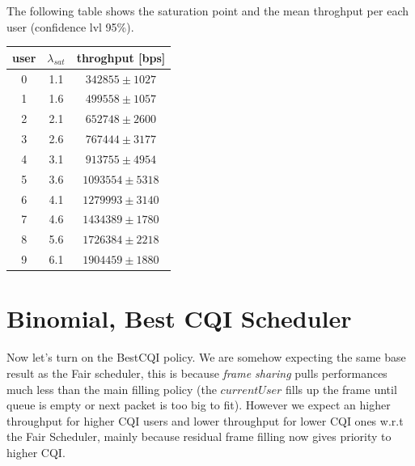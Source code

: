 The following table shows the saturation point and the mean throghput per each user (confidence lvl 95\%).
\begin{center}
	\begin{tabular}{|c | c | c|}
	\hline
	 \textbf{user}  & \textbf{\(\lambda_{sat}\)}  & \textbf{throghput [bps]} \\ \hline
	 0 & 1.1 & $342855 \pm 1027$ \\ \hline
	 1 & 1.6 & $499558 \pm 1057$\\ \hline
	 2 & 2.1 & $652748 \pm 2600$\\ \hline
	 3 & 2.6 & $767444 \pm 3177$\\ \hline
	 4 & 3.1 & $913755 \pm 4954$\\ \hline
	 5 & 3.6 & $1093554 \pm 5318$\\ \hline
	 6 & 4.1 & $1279993 \pm 3140$\\ \hline
	 7 & 4.6 & $1434389 \pm 1780$ \\ \hline
	 8 & 5.6 & $1726384 \pm 2218$ \\ \hline
	 9 & 6.1 & $1904459 \pm 1880$ \\ \hline
	\end{tabular}
\end{center}

\section{Binomial, Best CQI Scheduler}
Now let's turn on the BestCQI policy. We are somehow expecting the same base result as the Fair scheduler, this is because \textit{frame sharing} pulls performances much less than the main filling policy (the \(currentUser\) fills up the frame until queue is empty or next packet is too big to fit). However we expect an higher throughput for higher CQI users and lower throughput for lower CQI ones w.r.t the Fair Scheduler, mainly because residual frame filling now gives priority to higher CQI.

